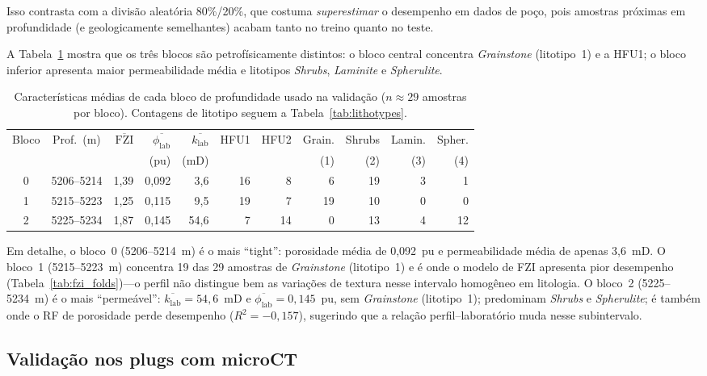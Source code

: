 \documentclass[11pt,a4paper]{article}
\begin{document}
Isso contrasta com a divisão aleatória 80\%/20\%, que costuma
\emph{superestimar} o desempenho em dados de poço, pois amostras
próximas em profundidade (e geologicamente semelhantes) acabam tanto no
treino quanto no teste.

A Tabela~\ref{tab:depthblocks} mostra que os três blocos são
petrofísicamente distintos: o bloco central concentra \emph{Grainstone}
(litotipo~1) e a HFU1; o bloco inferior apresenta maior permeabilidade
média e litotipos \emph{Shrubs}, \emph{Laminite} e \emph{Spherulite}.

\begin{table}[H]
  \centering
  \caption{Características médias de cada bloco de profundidade usado
           na validação ($n \approx 29$ amostras por bloco).
           Contagens de litotipo seguem a Tabela~\ref{tab:lithotypes}.}
  \label{tab:depthblocks}
  \scriptsize
  \begin{tabular}{ccrrrrrrrrr}
    \toprule
    Bloco & Prof.\ (m) & $\overline{\mathrm{FZI}}$ & $\overline{\phi_{\mathrm{lab}}}$
      & $\overline{k_{\mathrm{lab}}}$ & HFU1 & HFU2
      & Grain. & Shrubs & Lamin. & Spher. \\
    & & & (pu) & (mD) & & & (1) & (2) & (3) & (4) \\
    \midrule
    0 & 5206--5214 & 1,39 & 0,092 & 3,6  & 16 & 8  & 6  & 19 & 3 & 1 \\
    1 & 5215--5223 & 1,25 & 0,115 & 9,5  & 19 & 7  & 19 & 10 & 0 & 0 \\
    2 & 5225--5234 & 1,87 & 0,145 & 54,6 & 7  & 14 & 0  & 13 & 4 & 12 \\
    \bottomrule
  \end{tabular}
\end{table}

Em detalhe, o bloco~0 (5206--5214~m) é o mais ``tight'': porosidade média de
0,092~pu e permeabilidade média de apenas 3,6~mD.
O bloco~1 (5215--5223~m) concentra 19 das 29 amostras de \emph{Grainstone}
(litotipo~1) e é onde o modelo de FZI apresenta pior desempenho
(Tabela~\ref{tab:fzi_folds})---o perfil não distingue bem as variações
de textura nesse intervalo homogêneo em litologia.
O bloco~2 (5225--5234~m) é o mais ``permeável'': $\overline{k_{\mathrm{lab}}}
= 54{,}6$~mD e $\overline{\phi_{\mathrm{lab}}} = 0{,}145$~pu, sem
\emph{Grainstone} (litotipo~1); predominam \emph{Shrubs} e \emph{Spherulite};
é também onde o RF de porosidade perde desempenho ($R^2 = -0{,}157$),
sugerindo que a relação perfil--laboratório muda nesse subintervalo.

\subsection{Validação nos plugs com microCT}
\end{document}
